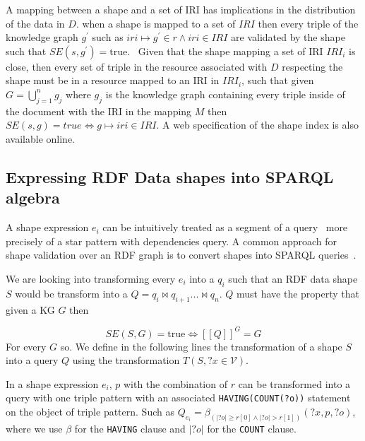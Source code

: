A mapping between a shape and a set of IRI has implications in the distribution of the data in $D$.
when a shape is mapped to a set of $IRI$ then every triple of the knowledge graph $g^{\prime}$ such as $iri \mapsto g^{\prime} \in r \land iri \in IRI$
are validated by the shape such that $SE(s, g^{\prime}) = \text{true}$.~
Given that the shape mapping a set of IRI $IRI_i$ is close, then every set of triple in the resource associated with $D$ respecting the shape must be in a resource mapped to an IRI in $IRI_i$, 
such that given $G = \bigcup\limits_{j=1}^{n} g_j$ where $g_j$ is the knowledge graph containing every triple inside of the document with the IRI in the mapping $M$
then $SE(s, g) = true \iff g \mapsto iri \in IRI$.
A web specification of the shape index is also available online.~


\subsection{Expressing RDF Data shapes into SPARQL algebra}
A shape expression $e_i$ can be intuitively treated as a segment of a query~\cite{delva2023} more precisely of a star pattern with dependencies query.
A common approach for shape validation over an RDF graph is to convert shapes into SPARQL queries~\cite{labragayo2017validatingdescribinglinkeddata, Corman2019, spapeExpressionConvert}.

We are looking into transforming every $e_i$ into a $q_i$ such that an RDF data shape $S$ would be transform into a $Q = q_i \bowtie q_{i+1} ... \bowtie q_n$.
$Q$ must have the property that given a KG $G$ then 

\begin{equation}\label{eq:shapeSPARQL}
   SE(S,G) = \mathrm{true} \iff [\![ Q ]\!]^{G} =  G
\end{equation}
For every $G$ so.
We define in the following lines the transformation of a shape $S$ into a query $Q$ using the transformation $T(S,?x \in \mathcal{V})$. 


\iffalse
INSPIRE YOURSELF BY Corman2019 style

!!add having count in the query definition for the cardinalities!!
https://www.w3.org/TR/sparql11-query\#sparqlHavingClause
\fi

\begin{prop}\label{prop:triplePattern}
   In a shape expression $e_i$, $p$ with the combination of $r$ can be transformed into a query with one triple pattern with an associated \texttt{HAVING(COUNT(?o))} statement on the object of triple pattern.
   Such as $Q_{e_i} = \beta_{(|?o| \geq r[0] \land |?o| > r[1])}(?x, p, ?o)$, where we use $\beta$ for the  \texttt{HAVING} clause and $|?o|$ for the \texttt{COUNT} clause. 
\end{prop}

